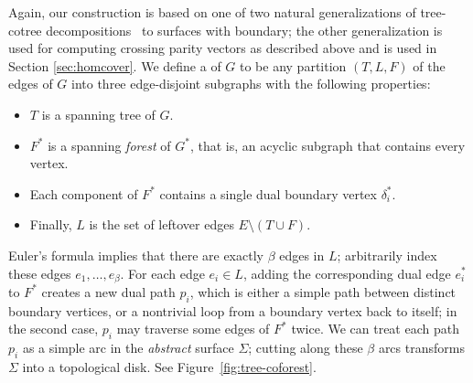 \documentclass[11pt,twoside]{article}
\def\dualarc{p}
\begin{document}
Again, our construction is based on one of two natural generalizations of tree-cotree decompositions~\cite{e-dgteg-03} to surfaces with boundary; the other generalization is used for computing crossing parity vectors as described above and is used in Section \ref{sec:homcover}.
We define a  of $G$ to be any partition $(T, L, F)$ of the edges of $G$ into three edge-disjoint subgraphs with the following properties:
\begin{itemize}\itemsep0pt
\item $T$ is a spanning tree of $G$.
\item $F^*$ is a spanning \emph{forest} of $G^*$, that is, an acyclic subgraph that contains every vertex.
\item Each component of $F^*$ contains a single dual boundary vertex $\delta_i^*$.
\item Finally, $L$ is the set of leftover edges $E \setminus (T\cup F)$.
\end{itemize}
Euler's formula implies that there are exactly $\beta$ edges in $L$; arbitrarily index these edges $e_1, \dots, e_\beta$.  For each edge $e_i\in L$, adding the corresponding dual edge $e_i^*$ to $F^*$ creates a new dual path $\dualarc_i$, which is either a simple path between distinct boundary vertices, or a nontrivial loop from a boundary vertex back to itself; in the second case, $\dualarc_i$ may traverse some edges of $F^*$ twice.  We can treat each path $\dualarc_i$ as a simple arc in the \emph{abstract} surface $\Sigma$; cutting along these $\beta$ arcs transforms $\Sigma$ into a topological disk.
See Figure~\ref{fig:tree-coforest}.
\end{document}
